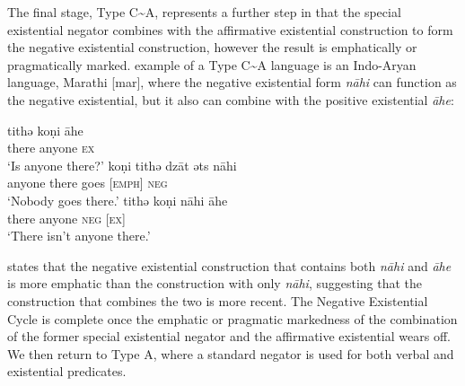 \documentclass[output=paper,colorlinks,citecolor=brown]{langscibook}
\begin{document}
%
The final stage, Type C{\textasciitilde}A, represents a further step in
that the special existential negator combines with the affirmative
existential construction to form the negative existential construction,
however the result is emphatically or pragmatically marked.
 example of a Type C{\textasciitilde}A language is an
Indo-Aryan language, Marathi [mar], where the negative existential form
\textit{nāhi} can function as the negative existential, but it also can
combine with the positive existential \textit{āhe}:
%
\begin{exe}\ex\label{ex:ieur-marathi-anyone}
\begin{xlist}
\ex
    \gll tithǝ  koṇi      āhe \\
there anyone \textsc{ex} \\
    \glt `Is anyone there?'
\ex
\gll koṇi      tithǝ  dzāt {\ob}ǝts{\cb}     nāhi\\
anyone there goes [\textsc{emph}] \textsc{neg}\\
\glt `Nobody goes there.'
\ex
\gll tithǝ  koṇi      nāhi {\ob}āhe{\cb}\\
there anyone \textsc{neg}  [\textsc{ex}]\\
\glt `There isn't anyone there.'
\end{xlist}\end{exe}
%
\citet[12]{Croft1991} states that the negative existential construction
that contains both \textit{nāhi} and \textit{āhe} is more emphatic than the
construction with only \textit{nāhi}, suggesting that the construction that
combines the two is more recent. The Negative Existential Cycle is complete
once the emphatic or pragmatic markedness of the combination of the former
special existential negator and the affirmative existential wears off. We
then return to Type A, where a standard negator is used for both verbal and
existential predicates. 
\end{document}
